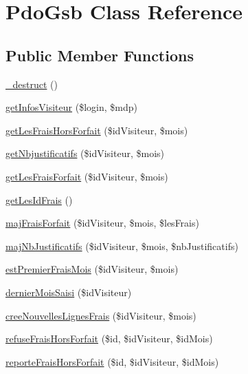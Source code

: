 \hypertarget{class_pdo_gsb}{}\section{Pdo\+Gsb Class Reference}
\label{class_pdo_gsb}
\subsection*{Public Member Functions}
\begin{DoxyCompactItemize}
\item 
\hyperlink{class_pdo_gsb_a1c6024f681d3956654622d9f28e540a2}{\+\_\+destruct} ()
\item 
\hyperlink{class_pdo_gsb_a3405f494d610cddab3b7dcfb2fe80d45}{get\+Infos\+Visiteur} (\$login, \$mdp)
\item 
\hyperlink{class_pdo_gsb_aa89782786e0037745abd9c62b25ade20}{get\+Les\+Frais\+Hors\+Forfait} (\$id\+Visiteur, \$mois)
\item 
\hyperlink{class_pdo_gsb_a147b85ddcddef68c57acf34857630ba7}{get\+Nbjustificatifs} (\$id\+Visiteur, \$mois)
\item 
\hyperlink{class_pdo_gsb_a5792eb474723cda0a758735f5fbb791e}{get\+Les\+Frais\+Forfait} (\$id\+Visiteur, \$mois)
\item 
\hyperlink{class_pdo_gsb_ad0943d4cabc4e6bfd803ecab13be0e57}{get\+Les\+Id\+Frais} ()
\item 
\hyperlink{class_pdo_gsb_abeb6aae3e806cd3235ebec6ae5cbe7de}{maj\+Frais\+Forfait} (\$id\+Visiteur, \$mois, \$les\+Frais)
\item 
\hyperlink{class_pdo_gsb_ac3bcdeeb2e7522120cec7ec068b153b3}{maj\+Nb\+Justificatifs} (\$id\+Visiteur, \$mois, \$nb\+Justificatifs)
\item 
\hyperlink{class_pdo_gsb_a426147406c706370eeb5d17175c33562}{est\+Premier\+Frais\+Mois} (\$id\+Visiteur, \$mois)
\item 
\hyperlink{class_pdo_gsb_a5bde16f5acfa92c7810433187f3e05f1}{dernier\+Mois\+Saisi} (\$id\+Visiteur)
\item 
\hyperlink{class_pdo_gsb_ae42a666f0c62b60a6fe35448e3600d8a}{cree\+Nouvelles\+Lignes\+Frais} (\$id\+Visiteur, \$mois)
\item 
\hyperlink{class_pdo_gsb_a8c4ed4306802e229bdaed4797556e962}{refuse\+Frais\+Hors\+Forfait} (\$id, \$id\+Visiteur, \$id\+Mois)
\item 
\hyperlink{class_pdo_gsb_aa0ac60fc083b55e7faec0689d5150bfd}{reporte\+Frais\+Hors\+Forfait} (\$id, \$id\+Visiteur, \$id\+Mois)
\item 

\end{DoxyCompactItemize}
